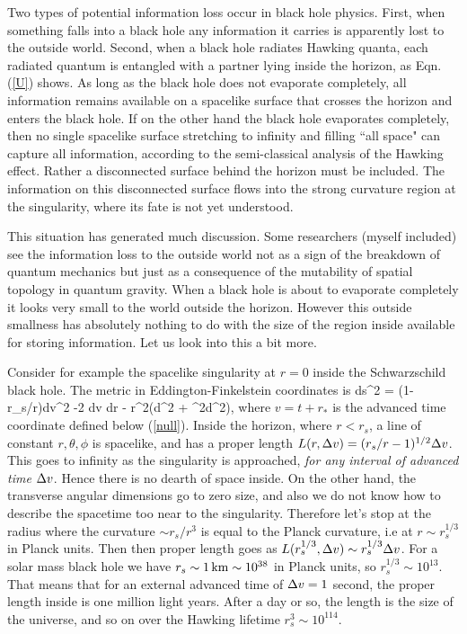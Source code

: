 \documentclass[12pt]{article}
\begin{document}
Two types of potential information loss occur in black hole
physics. First, when something falls into a black hole any information it carries is apparently lost to the outside world.
Second, when a black hole radiates Hawking quanta, each
radiated quantum is entangled with a partner lying inside the
horizon, as Eqn. (\ref{U}) shows. As long as the black hole
does not evaporate completely, all information remains available on a spacelike surface that crosses the horizon and enters the black hole. If on the other hand the black hole evaporates completely, then no single spacelike surface stretching to 
infinity and filling ``all space" can capture all
information, according to the semi-classical analysis of the 
Hawking effect.
Rather a disconnected surface behind the
horizon must be included. The information on this disconnected surface flows into the strong curvature region at the singularity,
where its fate is not yet understood.

This situation has generated much discussion. 
Some researchers (myself included) 
see the information loss
to the outside world not as a sign of the breakdown of
quantum mechanics but just as a consequence of the mutability of spatial topology in quantum gravity. When a black hole 
is about to evaporate completely it looks very small to the
world outside the horizon. However this outside smallness has
absolutely nothing to do with the size of the region inside
available for storing information. Let us look into this
a bit more.

Consider for example
the spacelike singularity at $r=0$ inside the Schwarzschild black 
hole. The metric in Eddington-Finkelstein coordinates
is
% 
\beq
ds^2 = (1-r_s/r)dv^2 -2 dv dr - r^2(d\theta^2 + \sin^2\theta d\phi^2),
\eeq
%
where $v=t+r_*$
is the advanced time 
coordinate defined below (\ref{null}). Inside the horizon,
where $r<r_s$, a line of constant $r,\theta,\phi$ is spacelike,
and has a proper length $L(r, \Delta v)=(r_s/r-1)^{1/2}\Delta v$.
This goes to infinity as the singularity is approached, 
{\it for any interval of advanced time} $\Delta v$. Hence there
is no dearth of space inside. On the other hand, the transverse
angular dimensions go to zero size, and also we do not know
how to describe the spacetime too near to the singularity.
Therefore let's stop at the radius where the curvature $\sim r_s/r^3$
is equal to the Planck curvature, i.e at $r\sim r_s^{1/3}$
in Planck units. Then then proper length goes as 
$L(r_s^{1/3}, \Delta v)\sim r_s^{1/3}\Delta v$. For a solar mass black
hole we have $r_s\sim 1\,  {\rm km} \sim 10^{38}$ in Planck
units, so $r_s^{1/3}\sim 10^{13}$. That means that 
for an external advanced time of $\Delta v=1$ second, the proper 
length inside is one million light years. After a day or so, 
the length is the size of the universe, and so on over the Hawking
lifetime $r_s^3\sim 10^{114}$. 
\end{document}

